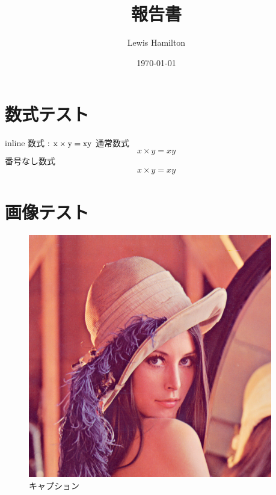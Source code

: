 \documentclass[uplatex, dvipdfmx]{jsarticle}
\title{\huge 報告書}
\author{Lewis Hamilton}
\date{\today}
\begin{document}
\maketitle
\thispagestyle{empty}
\newpage

\tableofcontents %
\newpage

\section{数式テスト}
inline 数式 : ${\rm x \times y = xy}$
通常数式
\begin{equation}
  x \times y = xy
\end{equation}
番号なし数式
\begin{eqnarray*}
  x \times y = xy
\end{eqnarray*}

\section{画像テスト}
\begin{figure}
  \centering
  \includegraphics[width=0.95\textwidth]{Lenna.png}
  \caption{キャプション}
  \label{fig:figure_label}
\end{figure}
\end{document}
